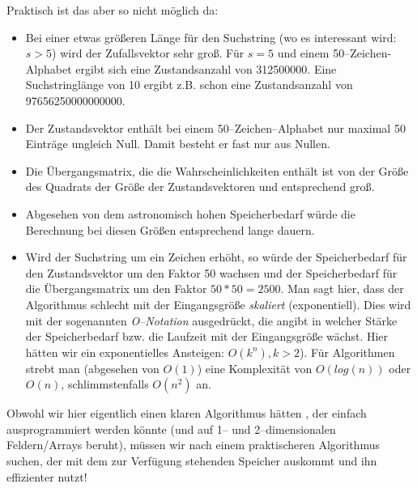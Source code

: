\documentclass[paper=a4,notitlepage,parskip=half,plainheadsepline]{scrartcl}
\begin{document}
Praktisch ist das aber so nicht möglich da:
\begin{itemize}
\item Bei einer etwas größeren Länge für den Suchstring (wo es interessant wird: $s>5$) wird der Zufallsvektor sehr groß. Für $s=5$ und einem 50--Zeichen-Alphabet ergibt sich eine Zustandsanzahl von 312500000.
Eine Suchstringlänge von 10 ergibt z.B. schon eine Zustandsanzahl von 97656250000000000.
\item Der Zustandsvektor enthält bei einem 50--Zeichen--Alphabet nur maximal 50 Einträge ungleich Null. Damit besteht er fast nur aus Nullen.
\item Die Übergangsmatrix, die die Wahrscheinlichkeiten enthält ist von der Größe des Quadrats der Größe der Zustandsvektoren und entsprechend groß.
\item Abgesehen von dem astronomisch hohen Speicherbedarf würde die Berechnung bei diesen Größen entsprechend lange dauern. 
\item Wird der Suchstring um ein Zeichen erhöht, so würde der Speicherbedarf für den Zustandsvektor um den Faktor 50 wachsen und der Speicherbedarf für die Übergangsmatrix um den Faktor $50*50=2500$. Man sagt hier, dass der Algorithmus schlecht mit der Eingangsgröße \emph{skaliert} (exponentiell). Dies wird mit der sogenannten \emph{O--Notation} ausgedrückt, die angibt in welcher Stärke der Speicherbedarf bzw. die Laufzeit mit der Eingangsgröße wächst. Hier hätten wir ein exponentielles Ansteigen: $O(k^n),k>2$).
Für Algorithmen strebt man (abgesehen von $O(1)$) eine Komplexität von $O(log(n))$ oder $O(n)$, schlimmstenfalls $O(n^2)$ an. 
\end{itemize} 

Obwohl wir hier eigentlich einen klaren Algorithmus hätten , der einfach ausprogrammiert werden könnte (und auf 1-- und 2--dimensionalen Feldern/Arrays beruht), müssen wir nach einem praktischeren Algorithmus suchen, der mit dem zur Verfügung stehenden Speicher auskommt und ihn effizienter nutzt!

\end{document}
